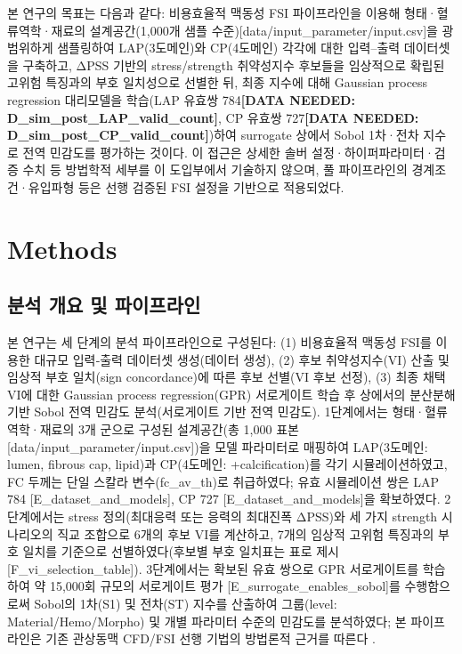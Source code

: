 \documentclass[preprint,12pt]{elsarticle}
\begin{document}
본 연구의 목표는 다음과 같다: 비용효율적 맥동성 FSI 파이프라인을 이용해 형태·혈류역학·재료의 설계공간(1,000개 샘플 수준)[data/input\_parameter/input.csv]을 광범위하게 샘플링하여 LAP(3도메인)와 CP(4도메인) 각각에 대한 입력–출력 데이터셋을 구축하고, ΔPSS 기반의 stress/strength 취약성지수 후보들을 임상적으로 확립된 고위험 특징과의 부호 일치성으로 선별한 뒤, 최종 지수에 대해 Gaussian process regression 대리모델을 학습(LAP 유효쌍 784\textbf{[DATA NEEDED: D\_sim\_post\_LAP\_valid\_count]}, CP 유효쌍 727\textbf{[DATA NEEDED: D\_sim\_post\_CP\_valid\_count]})하여 surrogate 상에서 Sobol 1차·전차 지수로 전역 민감도를 평가하는 것이다. 이 접근은 상세한 솔버 설정·하이퍼파라미터·검증 수치 등 방법학적 세부를 이 도입부에서 기술하지 않으며, 풀 파이프라인의 경계조건·유입파형 등은 선행 검증된 FSI 설정을 기반으로 적용되었다.

\section{Methods}

\subsection{분석 개요 및 파이프라인}
본 연구는 세 단계의 분석 파이프라인으로 구성된다: (1) 비용효율적 맥동성 FSI를 이용한 대규모 입력‑출력 데이터셋 생성(데이터 생성), (2) 후보 취약성지수(VI) 산출 및 임상적 부호 일치(sign concordance)에 따른 후보 선별(VI 후보 선정), (3) 최종 채택 VI에 대한 Gaussian process regression(GPR) 서로게이트 학습 후 상에서의 분산분해 기반 Sobol 전역 민감도 분석(서로게이트 기반 전역 민감도). 1단계에서는 형태·혈류역학·재료의 3개 군으로 구성된 설계공간(총 1,000 표본 [data/input\_parameter/input.csv])을 모델 파라미터로 매핑하여 LAP(3도메인: lumen, fibrous cap, lipid)과 CP(4도메인: +calcification)를 각기 시뮬레이션하였고, FC 두께는 단일 스칼라 변수(fc\_av\_th)로 취급하였다; 유효 시뮬레이션 쌍은 LAP 784 [E\_dataset\_and\_models], CP 727 [E\_dataset\_and\_models]을 확보하였다. 2단계에서는 stress 정의(최대응력 또는 응력의 최대진폭 ΔPSS)와 세 가지 strength 시나리오의 직교 조합으로 6개의 후보 VI를 계산하고, 7개의 임상적 고위험 특징과의 부호 일치를 기준으로 선별하였다(후보별 부호 일치표는 표로 제시 [F\_vi\_selection\_table]). 3단계에서는 확보된 유효 쌍으로 GPR 서로게이트를 학습하여 약 15,000회 규모의 서로게이트 평가 [E\_surrogate\_enables\_sobol]를 수행함으로써 Sobol의 1차(S1) 및 전차(ST) 지수를 산출하여 그룹(level: Material/Hemo/Morpho) 및 개별 파라미터 수준의 민감도를 분석하였다; 본 파이프라인은 기존 관상동맥 CFD/FSI 선행 기법의 방법론적 근거를 따른다 \cite{chaichana2012}. 
\end{document}
